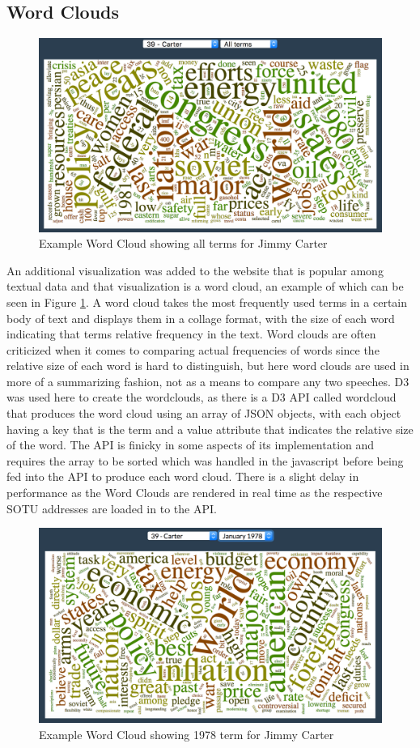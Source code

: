 \documentclass[acmtog, review, screen]{acmart}
\begin{document}
\subsection{Word Clouds}
\begin{figure}
  \includegraphics[width=\columnwidth]{Wordcloud.png}
  \caption{Example Word Cloud showing all terms for Jimmy Carter}
  \label{fig:wordcloud1}
\end{figure}
An additional visualization was added to the website that is popular among textual data and that visualization is a word cloud, an example of which can be seen in Figure \ref{fig:wordcloud1}.
A word cloud takes the most frequently used terms in a certain body of text and displays them in a collage format, with the size of each word indicating that terms relative frequency in the text.
Word clouds are often criticized when it comes to comparing actual frequencies of words since the relative size of each word is hard to distinguish, but here word clouds are used in more of a summarizing fashion, not as a means to compare any two speeches.
D3 was used here to create the wordclouds, as there is a D3 API called wordcloud that produces the word cloud using an array of JSON objects, with each object having a key that is the term and a value attribute that indicates the relative size of the word.
The API is finicky in some aspects of its implementation and requires the array to be sorted which was handled in the javascript before being fed into the API to produce each word cloud.
There is a slight delay in performance as the Word Clouds are rendered in real time as the respective SOTU addresses are loaded in to the API.
\begin{figure}
  \includegraphics[width=\columnwidth]{Wordcloudterm.png}
  \caption{Example Word Cloud showing 1978 term for Jimmy Carter}
  \label{fig:wordcloud2}
\end{figure}
\end{document}
